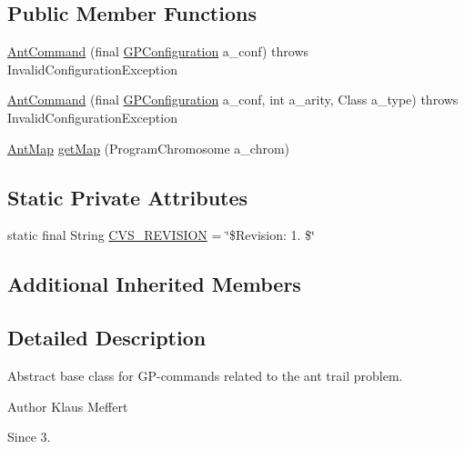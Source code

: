 \subsection*{Public Member Functions}
\begin{DoxyCompactItemize}
\item 
\hyperlink{classexamples_1_1gp_1_1anttrail_1_1_ant_command_a2815672e4240eae4853f4e56dfc9614b}{Ant\-Command} (final \hyperlink{classorg_1_1jgap_1_1gp_1_1impl_1_1_g_p_configuration}{G\-P\-Configuration} a\-\_\-conf)  throws Invalid\-Configuration\-Exception 
\item 
\hyperlink{classexamples_1_1gp_1_1anttrail_1_1_ant_command_ab284c6ce843fbff5779f08b00e651229}{Ant\-Command} (final \hyperlink{classorg_1_1jgap_1_1gp_1_1impl_1_1_g_p_configuration}{G\-P\-Configuration} a\-\_\-conf, int a\-\_\-arity, Class a\-\_\-type)  throws Invalid\-Configuration\-Exception 
\item 
\hyperlink{classexamples_1_1gp_1_1anttrail_1_1_ant_map}{Ant\-Map} \hyperlink{classexamples_1_1gp_1_1anttrail_1_1_ant_command_a968638fbe6ed0bc6af625b25916e7996}{get\-Map} (Program\-Chromosome a\-\_\-chrom)
\end{DoxyCompactItemize}
\subsection*{Static Private Attributes}
\begin{DoxyCompactItemize}
\item 
static final String \hyperlink{classexamples_1_1gp_1_1anttrail_1_1_ant_command_a7f6d89fdbe64b14ca611ab0dc419b5d3}{C\-V\-S\-\_\-\-R\-E\-V\-I\-S\-I\-O\-N} = \char`\"{}\$Revision\-: 1. \$\char`\"{}
\end{DoxyCompactItemize}
\subsection*{Additional Inherited Members}


\subsection{Detailed Description}
Abstract base class for G\-P-\/commands related to the ant trail problem.

\begin{DoxyAuthor}{Author}
Klaus Meffert 
\end{DoxyAuthor}
\begin{DoxySince}{Since}
3. 
\end{DoxySince}


